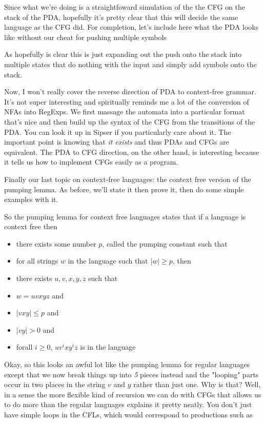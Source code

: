 \documentclass[11pt]{article}
\begin{document}
Since what we're doing is a straightfoward simulation of the the CFG on the stack of the PDA, hopefully it's pretty clear that this will decide the same language as the CFG did. For completion, let's include here what the PDA looks like without our cheat for pushing multiple symbols

As hopefully is clear this is just expanding out the push onto the stack into multiple states that do nothing with the input and simply add symbols onto the stack.

Now, I won't really cover the reverse direction of PDA to context-free grammar. It's not super interesting and spiritually reminds me a lot of the conversion of NFAs into RegExps. We first massage the automata into a particular format that's nice and then build up the syntax of the CFG from the transitions of the PDA. You can look it up in Sipser if you particularly care about it. The important point is knowing that \emph{it exists} and thus PDAs and CFGs are equivalent. The PDA to CFG direction, on the other hand, is interesting because it tells us how to implement CFGs easily as a program.

Finally our last topic on context-free languages: the context free version of the pumping lemma. As before, we'll state it then prove it, then do some simple examples with it.

So the pumping lemma for context free languages states that if a language is context free then
\begin{itemize}
\item there exists some number $p$, called the pumping constant such that
\item for all strings $w$ in the language such that $|w| \ge p$, then
\item there exists $u,v,x,y,z$ such that
\item $w = uvxyz$ and
\item $|vxy| \le p$ and
\item $|vy| > 0$ and
\item forall $i \ge 0$, $uv^ixy^iz$ is in the language
\end{itemize}

Okay, so this looks an awful lot like the pumping lemma for regular languages except that we now break things up into \emph{5} pieces instead and the "looping" parts occur in two places in the string $v$ and $y$ rather than just one. Why is that? Well, in a sense the more flexible kind of recursion we can do with CFGs that allows us to do more than the regular languages explains it pretty neatly. You don't just have simple loops in the CFLs, which would correspond to productions such as 
\end{document}

